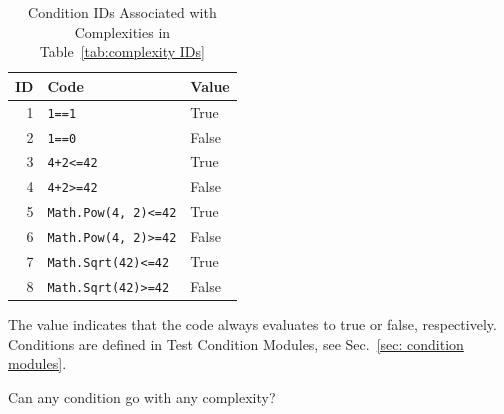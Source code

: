 \documentclass[12pt]{article}
\begin{document}
\begin{table}[H]
\centering
\begin{tabular}{|r|l|l|}
\hline
\textbf{ID} & \textbf{Code} & \textbf{Value} \\
\hline
1 & \verb|1==1| & True \\
\hline
2 & \verb|1==0| & False \\
\hline
3 & \verb|4+2<=42| & True \\
\hline
4 & \verb|4+2>=42| & False \\
\hline
5 & \verb|Math.Pow(4, 2)<=42| & True \\
\hline
6 & \verb|Math.Pow(4, 2)>=42| & False \\
\hline
7 & \verb|Math.Sqrt(42)<=42| & True \\
\hline
8 & \verb|Math.Sqrt(42)>=42| & False \\
\hline
\end{tabular}
\caption{Condition IDs Associated with Complexities in Table~\ref{tab:complexity IDs}}
\label{tab:condition IDs}
\end{table}

The value indicates that the code always evaluates to true or false,
respectively.
Conditions are defined in Test Condition Modules,
see Sec.~\ref{sec: condition modules}.

{\Large Can any condition go with any complexity?}
\end{document}
